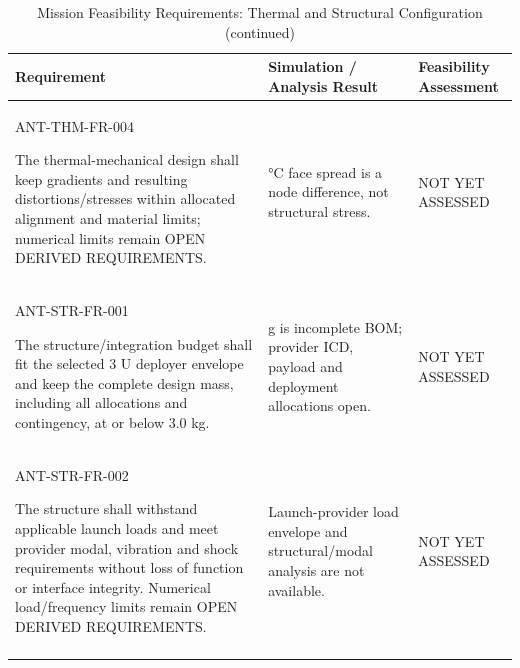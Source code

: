 \begin{table}[H]\centering\small\setlength{\tabcolsep}{3pt}
\ContinuedFloat\captionsetup{list=no}
\caption{Mission Feasibility Requirements: Thermal and Structural Configuration (continued)}
\begin{tabular}{@{}
>{\RaggedRight\arraybackslash}p{}
>{\RaggedRight\arraybackslash}p{}
>{\RaggedRight\arraybackslash}p{}
@{}}
\toprule Requirement & Simulation / Analysis Result & Feasibility Assessment\\\midrule
{}\label{req:ANT-THM-FR-004}\mbox{ANT-THM-}\newline\mbox{FR-004}\par The thermal-mechanical design shall keep gradients and resulting distortions/stresses within allocated alignment and material limits; numerical limits remain OPEN DERIVED REQUIREMENTS. & 31.704°C face spread is a node difference, not structural stress. & NOT YET ASSESSED\\
\addlinespace[3pt]
\label{req:ANT-STR-FR-001}\mbox{ANT-STR-}\newline\mbox{FR-001}\par The structure/integration budget shall fit the selected 3 U deployer envelope and keep the complete design mass, including all allocations and contingency, at or below 3.0 kg. & 1536.3 g is incomplete BOM; provider ICD, payload and deployment allocations open. & NOT YET ASSESSED\\
\addlinespace[3pt]
\label{req:ANT-STR-FR-002}\mbox{ANT-STR-}\newline\mbox{FR-002}\par The structure shall withstand applicable launch loads and meet provider modal, vibration and shock requirements without loss of function or interface integrity. Numerical load/frequency limits remain OPEN DERIVED REQUIREMENTS. & Launch-provider load envelope and structural/modal analysis are not available. & NOT YET ASSESSED\\
\addlinespace[3pt]
\bottomrule
\end{tabular}
\end{table}
